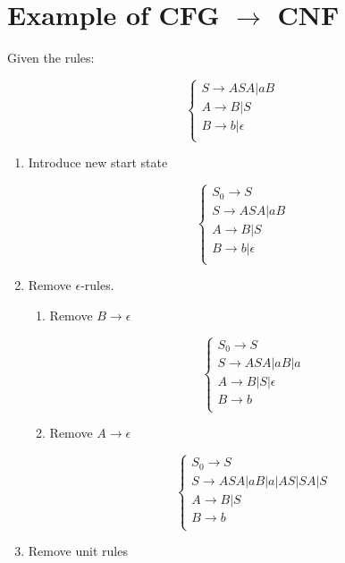 \documentclass{article}
\begin{document}
\section*{Example of CFG $\rightarrow$ CNF}

Given the rules:

\[\begin{cases}
S\rightarrow ASA|aB \\
A\rightarrow B|S \\
B\rightarrow b|\epsilon \\
\end{cases}\]

\begin{enumerate}[label=(Step \arabic*)]
\item Introduce new start state

\[\begin{cases}
S_0 \rightarrow S \\
S\rightarrow ASA|aB \\
A\rightarrow B|S \\
B\rightarrow b|\epsilon \\
\end{cases}\]

\item Remove $\epsilon$-rules.

  \begin{enumerate}[label=(\alph*)]
  \item Remove $B\rightarrow{}\epsilon$

    \[\begin{cases}
    S_0 \rightarrow S \\
    S\rightarrow ASA|aB|a \\
    A\rightarrow B|S|\epsilon \\
    B\rightarrow b \\
    \end{cases}\]

  \item Remove $A\rightarrow\epsilon$

    \[\begin{cases}
    S_0 \rightarrow S \\
    S\rightarrow ASA|aB|a|AS|SA|S \\
    A\rightarrow B|S \\
    B\rightarrow b \\
    \end{cases}\]
  \end{enumerate}

\item Remove unit rules


\end{enumerate}
\end{document}

